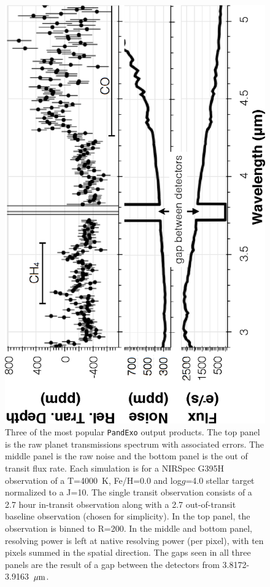 \documentclass[iop]{emulateapj}
\begin{document}
\begin{figure}[ht]
 \includegraphics[angle=270,origin=c,width=\linewidth]{fig3.eps}
\caption{Three of the most popular \texttt{PandExo} output products. The top panel is the raw planet transmissions spectrum with associated errors. The middle panel is the raw noise and the bottom panel is the out of transit flux rate. Each simulation is for a NIRSpec G395H observation of a T=4000~K, Fe/H=0.0 and log$g$=4.0 stellar target normalized to a J=10. The single transit observation consists of a 2.7 hour in-transit observation along with a 2.7 out-of-transit baseline observation (chosen for simplicity). In the top panel, the observation is binned to R=200. In the middle and bottom panel, resolving power is left at native resolving power (per pixel), with ten pixels summed in the spatial direction. The gaps seen in all three panels are the result of a gap between the detectors from 3.8172-3.9163~$\mbox{$\mu$m}$. \label{fig3}}
\end{figure}
\end{document}

